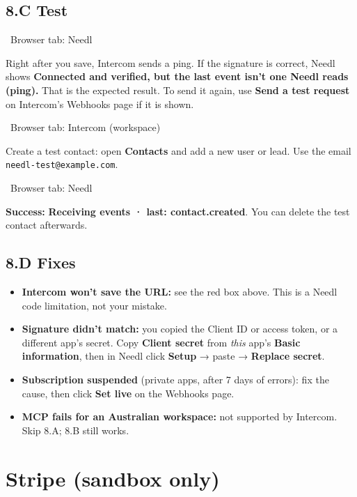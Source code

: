 \documentclass[11pt,a4paper]{article}
\newcommand{\ui}[1]{\textbf{#1}}
\newcommand{\where}[1]{\par\smallskip\noindent\colorbox{winbg}{\color{winfg}\bfseries\strut\ #1\ }\par\nopagebreak[4]}
\newcommand{\lit}[1]{\texttt{#1}}
\begin{document}
\subsection*{8.C Test}
\where{Browser tab: Needl}
Right after you save, Intercom sends a ping. If the signature is correct, Needl shows \ui{Connected and verified, but the last event isn't one Needl reads (ping).} That is the expected result. To send it again, use \ui{Send a test request} on Intercom's Webhooks page if it is shown.
\where{Browser tab: Intercom (workspace)}
Create a test contact: open \ui{Contacts} and add a new user or lead.
Use the email \lit{needl-test@example.com}.
\where{Browser tab: Needl}
\textbf{Success:} \ui{Receiving events · last: contact.created}. You can delete the test contact afterwards.

\subsection*{8.D Fixes}
\begin{itemize}
\item \textbf{Intercom won't save the URL:} see the red box above. This is a Needl code limitation, not your mistake.
\item \textbf{Signature didn't match:} you copied the Client ID or access token, or a different app's secret. Copy \ui{Client secret} from \emph{this} app's \ui{Basic information}, then in Needl click \ui{Setup} → paste → \ui{Replace secret}.
\item \textbf{Subscription suspended} (private apps, after 7 days of errors): fix the cause, then click \ui{Set live} on the Webhooks page.
\item \textbf{MCP fails for an Australian workspace:} not supported by Intercom. Skip 8.A; 8.B still works.
\end{itemize}

\clearpage
\section{Stripe (sandbox only)}
\end{document}
